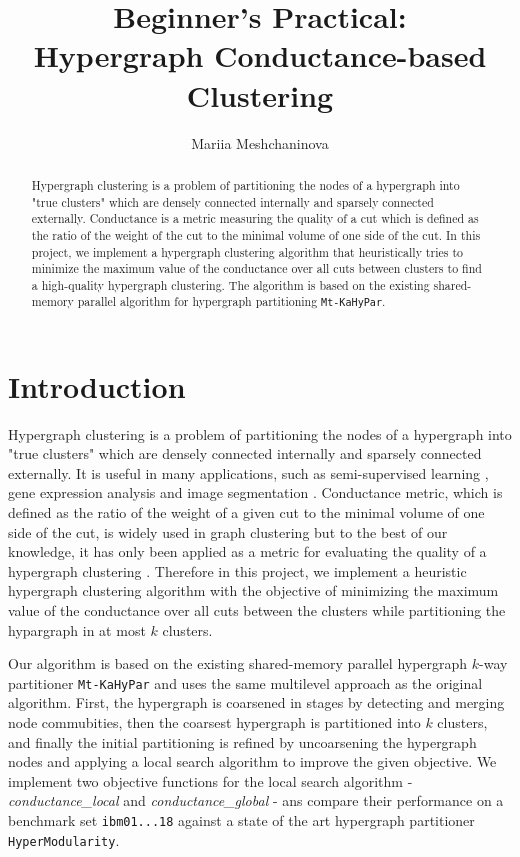 \documentclass[acmsmall,nonacm,screen,review]{acmart}
\title{Beginner's Practical: \\ Hypergraph Conductance-based Clustering}
\author{Mariia Meshchaninova}
\affiliation{%
  \institution{Heidelberg University}
  \streetaddress{Im Neuenheimer Feld 205}
  \city{Heidelberg}
  \state{Baden-Württemberg}
  \country{Germany}
  \postcode{69120}
}
\date{}
\begin{document}
\begin{abstract}
Hypergraph clustering is a problem of partitioning the nodes of 
a hypergraph into "true clusters" which are densely connected internally 
and sparsely connected externally. Conductance is a metric measuring the 
quality of a cut which is defined as the ratio of the weight of the cut 
to the minimal volume of one side of the cut.
In this project, we implement a hypergraph clustering algorithm that
heuristically tries to minimize the maximum value of the conductance 
over all cuts between clusters to find a high-quality hypergraph 
clustering. The algorithm is based on the existing shared-memory 
parallel algorithm for hypergraph partitioning \texttt{Mt-KaHyPar}.
\end{abstract}
\maketitle

\section{Introduction}
Hypergraph clustering is a problem of partitioning the nodes of a hypergraph
into "true clusters" which are densely connected internally and sparsely
connected externally. It is useful in many applications, such as 
semi-supervised learning \cite{ApplicationLearning}, 
gene expression analysis \cite{ApplicationGeneExpression}
and image segmentation \cite{ApplicationImageSegmentation}. 
Conductance metric, which is defined as the ratio of the weight of a given
cut to the minimal volume of one side of the cut, is widely used in graph 
clustering \cite{GraphConductance2023,GraphConductance2006} but to the best
of our knowledge, it has only been applied as a metric for evaluating the
quality of a hypergraph clustering \cite{HyperSF}. Therefore in this 
project, we implement a heuristic hypergraph clustering algorithm with the
objective of minimizing the maximum value of the conductance over all cuts 
between the clusters while partitioning the hypargraph in at most $k$ clusters. 

\noindent Our algorithm is based on the existing shared-memory parallel 
hypergraph $k$-way partitioner \texttt{Mt-KaHyPar} and uses the same 
multilevel approach as the original algorithm. First, the hypergraph is 
coarsened in stages by detecting and merging node commubities, then the 
coarsest hypergraph is partitioned into $k$ clusters, and finally the 
initial partitioning is refined by uncoarsening the hypergraph nodes and 
applying a local search algorithm to improve the given objective. We 
implement two objective functions for the local search algorithm - 
\textit{conductance\_local} and \textit{conductance\_global} - 
ans compare their performance on a benchmark set \texttt{ibm01...18} 
against a state of the art hypergraph partitioner \texttt{HyperModularity}.
\end{document}
